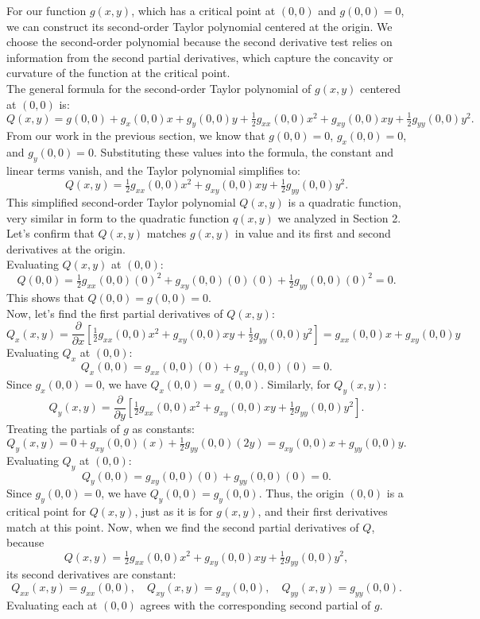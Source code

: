 \documentclass{article}
\newcommand{\mpfrac}[1]{\frac{\partial}{\partial #1}}
\begin{document}
For our function \( g(x,y) \), which has a critical point at \( (0,0) \) and \( g(0,0)=0 \), we can construct its second-order Taylor polynomial centered at the origin. We choose the second-order polynomial because the second derivative test relies on information from the second partial derivatives, which capture the concavity or curvature of the function at the critical point. \\

The general formula for the second-order Taylor polynomial of \( g(x,y) \) centered at \( (0,0) \) is:
\[
	Q(x,y) = g(0,0) + g_{x}(0,0)x + g_{y}(0,0)y + \tfrac{1}{2}g_{xx}(0,0)x^{2} + g_{xy}(0,0)xy + \tfrac{1}{2}g_{yy}(0,0)y^{2}.
\]
From our work in the previous section, we know that \( g(0,0) = 0 \), \( g_{x}(0,0) = 0 \), and \( g_{y}(0,0) = 0 \). Substituting these values into the formula, the constant and linear terms vanish, and the Taylor polynomial simplifies to:
\[
	Q(x,y) = \tfrac{1}{2}g_{xx}(0,0)x^{2} + g_{xy}(0,0)xy + \tfrac{1}{2}g_{yy}(0,0)y^{2}.
\]
This simplified second-order Taylor polynomial \( Q(x,y) \) is a quadratic function, very similar in form to the quadratic function \( q(x,y) \) we analyzed in Section 2. Let's confirm that \( Q(x,y) \) matches \( g(x,y) \) in value and its first and second derivatives at the origin. \\

Evaluating \( Q(x,y) \) at \( (0,0) \):
\[
	Q(0,0) = \tfrac{1}{2}g_{xx}(0,0)(0)^{2} + g_{xy}(0,0)(0)(0) + \tfrac{1}{2}g_{yy}(0,0)(0)^{2} = 0.
\]
This shows that \( Q(0,0) = g(0,0) = 0 \). \\

Now, let's find the first partial derivatives of \( Q(x,y) \):
\[
	Q_{x}(x,y) = \mpfrac{x}\left[\tfrac{1}{2}g_{xx}(0,0)x^{2} + g_{xy}(0,0)xy + \tfrac{1}{2}g_{yy}(0,0)y^{2}\right] = g_{xx}(0,0)x + g_{xy}(0,0)y
\]
Evaluating \( Q_x \) at \( (0,0) \):
\[
	Q_{x}(0,0) = g_{xx}(0,0)(0) + g_{xy}(0,0)(0) = 0.
\]
Since \( g_x(0,0) = 0 \), we have \( Q_x(0,0) = g_x(0,0) \). Similarly, for \( Q_{y}(x,y) \):
\[
	Q_{y}(x,y) = \mpfrac{y}\left[\tfrac{1}{2}g_{xx}(0,0)x^{2} + g_{xy}(0,0)xy + \tfrac{1}{2}g_{yy}(0,0)y^{2}\right].
\]
Treating the partials of \( g \) as constants:
\[
	Q_{y}(x,y) = 0 + g_{xy}(0,0)(x) + \tfrac{1}{2}g_{yy}(0,0)(2y) = g_{xy}(0,0)x + g_{yy}(0,0)y.
\]
Evaluating \( Q_y \) at \( (0,0) \):
\[
	Q_{y}(0,0) = g_{xy}(0,0)(0) + g_{yy}(0,0)(0) = 0.
\]
Since \( g_y(0,0) = 0 \), we have \( Q_y(0,0) = g_y(0,0) \). Thus, the origin \( (0,0) \) is a critical point for \( Q(x,y) \), just as it is for \( g(x,y) \), and their first derivatives match at this point. Now, when we find the second partial derivatives of \( Q \), because 
\[
	Q(x,y) = \tfrac{1}{2} g_{xx}(0,0)x^{2} + g_{xy}(0,0)xy + \tfrac{1}{2}g_{yy}(0,0)y^{2},
\]
its second derivatives are constant:
\[
	Q_{xx}(x,y) = g_{xx}(0,0), \quad Q_{xy}(x,y) = g_{xy}(0,0), \quad Q_{yy}(x,y) = g_{yy}(0,0).
\]
Evaluating each at \( (0,0) \) agrees with the corresponding second partial of \( g \). \\
\end{document}
